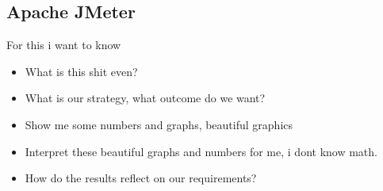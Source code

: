 \subsection{Apache JMeter}
For this i want to know
\begin{itemize}
    \item What is this shit even?
    \item What is our strategy, what outcome do we want?
    \item Show me some numbers and graphs, beautiful graphics
    \item Interpret these beautiful graphs and numbers for me, i dont know math.
    \item How do the results reflect on our requirements?
\end{itemize}
